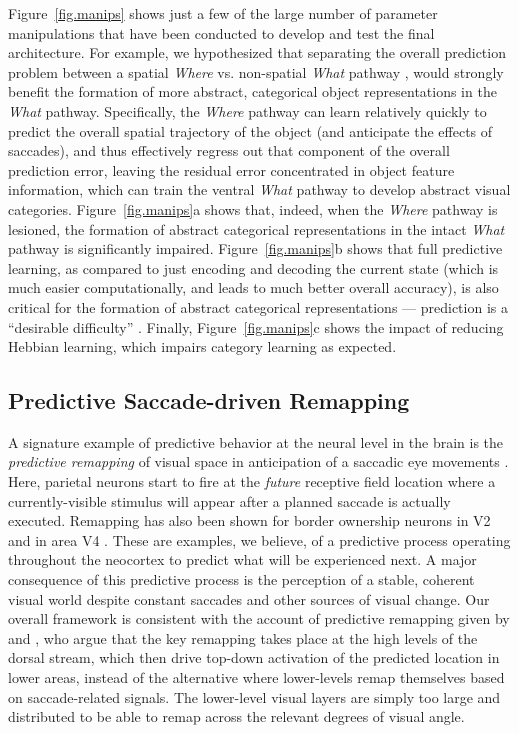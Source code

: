 \documentclass[11pt,twoside]{article}
\newif\myifpdf
\begin{document}
Figure~\ref{fig.manips} shows just a few of the large number of parameter manipulations that have been conducted to develop and test the final architecture.  For example, we hypothesized that separating the overall prediction problem between a spatial \emph{Where} vs. non-spatial \emph{What} pathway \cite{UngerleiderMishkin82,GoodaleMilner92}, would strongly benefit the formation of more abstract, categorical object representations in the \emph{What} pathway.  Specifically, the \emph{Where} pathway can learn relatively quickly to predict the overall spatial trajectory of the object (and anticipate the effects of saccades), and thus effectively regress out that component of the overall prediction error, leaving the residual error concentrated in object feature information, which can train the ventral \emph{What} pathway to develop abstract visual categories.  Figure~\ref{fig.manips}a shows that, indeed, when the \emph{Where} pathway is lesioned, the formation of abstract categorical representations in the intact \emph{What} pathway is significantly impaired.  Figure~\ref{fig.manips}b shows that full predictive learning, as compared to just encoding and decoding the current state (which is much easier computationally, and leads to much better overall accuracy), is also critical for the formation of abstract categorical representations --- prediction is a ``desirable difficulty'' \cite{Bjork94}.  Finally, Figure~\ref{fig.manips}c shows the impact of reducing Hebbian learning, which impairs category learning as expected.

\subsection{Predictive Saccade-driven Remapping}

A signature example of predictive behavior at the neural level in the brain is the {\em predictive remapping} of visual space in anticipation of a saccadic eye movements \cite{DuhamelColbyGoldberg92,ColbyDuhamelGoldberg97,GottliebKusunokiGoldberg98,NakamuraColby02,MarinoMazer16}.  Here, parietal neurons start to fire at the {\em future} receptive field location where a currently-visible stimulus will appear after a planned saccade is actually executed. Remapping has also been shown for border ownership neurons in V2 \cite{OHerronHeydt13} and in area V4 \cite{NeupaneGuittonPack16}. These are examples, we believe, of a predictive process operating throughout the neocortex to predict what will be experienced next.  A major consequence of this predictive process is the perception of a stable, coherent visual world despite constant saccades and other sources of visual change.  Our overall framework is consistent with the account of predictive remapping given by  and , who argue that the key remapping takes place at the high levels of the dorsal stream, which then drive top-down activation of the predicted location in lower areas, instead of the alternative where lower-levels remap themselves based on saccade-related signals.  The lower-level visual layers are simply too large and distributed to be able to remap across the relevant degrees of visual angle.
\end{document}
